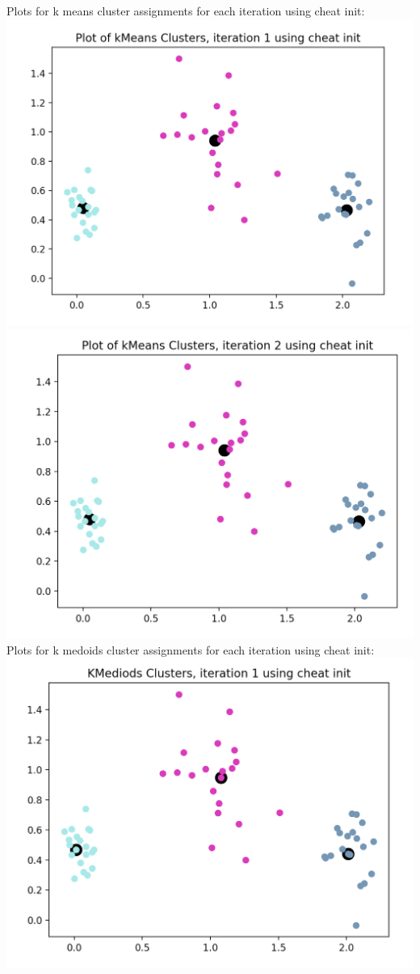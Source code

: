 \documentclass[11pt]{article}
\newcommand{\solution}[1]{{{\color{blue}{\bf Solution:} {#1}}}}
\begin{document}
\solution{
Plots for k means cluster assignments for each iteration using cheat init: \newline{}
\includegraphics[scale=0.5]{kmeans-cheat-iter-1.png} \newline{}
\includegraphics[scale=0.5]{kmeans-cheat-iter-2.png} \newline{}
Plots for k medoids cluster assignments for each iteration using cheat init: \newline{}
\includegraphics[scale=0.5]{kmed-cheat-iter-1.png} \newline{}
}
\end{document}
